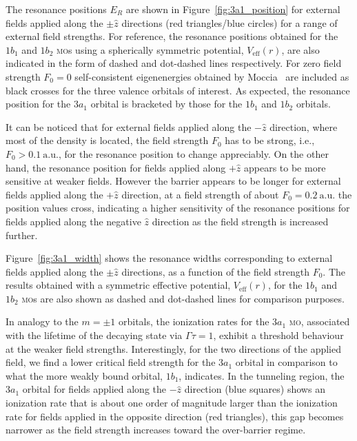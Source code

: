 The resonance positions $E_{R}$ are shown in
Figure~\ref{fig:3a1_position} for external fields applied along the
$\pm\hat{z}$ directions (red triangles/blue circles) for a range of
external field strengths. For reference, the resonance positions
obtained for the $1b_{1}$ and $1b_{2}$ \textsc{mo}s using a
spherically symmetric potential, $V_{\mathrm{eff}}(r)$, are also
indicated in the form of dashed and dot-dashed lines respectively. For
zero field strength $F_{0} = 0$ self-consistent eigenenergies obtained
by Moccia~\cite{Moccia_1964} are included as black crosses for the
three valence orbitals of interest. As expected, the resonance
position for the $3a_{1}$ orbital is bracketed by those for the
$1b_{1}$ and $1b_{2}$ orbitals.

It can be noticed that for external fields applied along the
$-\hat{z}$ direction, where most of the density is located, the field
strength $F_{0}$ has to be strong, i.e., $F_{0}>0.1\ \mathrm{a.u.}$,
for the resonance position to change appreciably. On the other hand,
the resonance position for fields applied along $+\hat{z}$ appears to
be more sensitive at weaker fields. However the barrier appears to be
longer for external fields applied along the $+\hat{z}$ direction, at
a field strength of about $F_{0} = 0.2\ \mathrm{a.u.}$ the position
values cross, indicating a higher sensitivity of the resonance
positions for fields applied along the negative $\hat{z}$ direction as
the field strength is increased further.

Figure~\ref{fig:3a1_width} shows the resonance widths corresponding to
external fields applied along the $\pm\hat{z}$ directions, as a
function of the field strength $F_{0}$. The results obtained with a
symmetric effective potential, $V_{\mathrm{eff}}(r)$, for the $1b_{1}$
and $1b_{2}$ \textsc{mo}s are also shown as dashed and dot-dashed
lines for comparison purposes.

In analogy to the $m=\pm 1$ orbitals, the ionization rates for the
$3a_{1}$ \textsc{mo}, associated with the lifetime of the decaying
state via $\Gamma\tau=1$, exhibit a threshold behaviour at the weaker
field strengths. Interestingly, for the two directions of the applied
field, we find a lower critical field strength for the $3a_{1}$
orbital in comparison to what the more weakly bound orbital, $1b_{1}$,
indicates.  In the tunneling region, the $3a_{1}$ orbital for fields
applied along the $-\hat{z}$ direction (blue squares) shows an
ionization rate that is about one order of magnitude larger than the
ionization rate for fields applied in the opposite direction (red
triangles), this gap becomes narrower as the field strength increases
toward the over-barrier regime.

